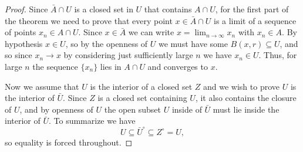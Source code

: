 \begin{proof}
  Since \(\bar A\cap U\) is a closed set in \(U\) that contains
  \(A\cap U\), for the first part of the theorem we need to prove that
  every point \(x\in\bar A\cap U\) is a limit of a sequence of points
  \(x_n\in A\cap U\). Since \(x\in\bar A\) we can write
  \(x=\lim_{n\to\infty}x_n\) with \(x_n\in A\). By hypothesis \(x\in U\),
  so by the openness of \(U\) we must have some \(B(x,r)\subseteq U\), and
  so since \(x_n\to x\) by considering just sufficiently large \(n\) we
  have \(x_n\in U\). Thus, for large \(n\) the sequence \(\{x_n\}\) lies in
  \(A\cap U\) and converges to \(x\).

  Now we assume that \(U\) is the interior of a closed set \(Z\) and we
  wish to prove \(U\) is the interior of \(\bar U\). Since \(Z\) is a
  closed set containing \(U\), it also contains the closure of \(U\), and
  by openness of \(U\) the open subset \(U\) inside of \(\bar U\) must lie
  inside the interior of \(\bar U\). To summarize we have
  \[
    U\subseteq{\bar U}^\circ\subseteq Z^\circ=U,
  \]
  so equality is forced throughout.
\end{proof}

